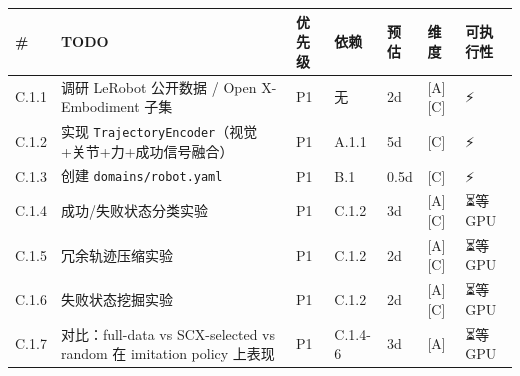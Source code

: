 \documentclass[
  12pt,
]{ctexart}
\begin{document}
\begin{longtable}[]{@{}
  >{\raggedright\arraybackslash}p{}
  >{\raggedright\arraybackslash}p{}
  >{\raggedright\arraybackslash}p{}
  >{\raggedright\arraybackslash}p{}
  >{\raggedright\arraybackslash}p{}
  >{\raggedright\arraybackslash}p{}
  >{\raggedright\arraybackslash}p{}@{}}
\toprule\noalign{}
\begin{minipage}[b]{\linewidth}\raggedright
\#
\end{minipage} & \begin{minipage}[b]{\linewidth}\raggedright
TODO
\end{minipage} & \begin{minipage}[b]{\linewidth}\raggedright
优先级
\end{minipage} & \begin{minipage}[b]{\linewidth}\raggedright
依赖
\end{minipage} & \begin{minipage}[b]{\linewidth}\raggedright
预估
\end{minipage} & \begin{minipage}[b]{\linewidth}\raggedright
维度
\end{minipage} & \begin{minipage}[b]{\linewidth}\raggedright
可执行性
\end{minipage} \\
\midrule\noalign{}
\endhead
\bottomrule\noalign{}
\endlastfoot
C.1.1 & 调研 LeRobot 公开数据 / Open X-Embodiment 子集 & P1 & 无 & 2d &
{[}A{]}{[}C{]} & ⚡ \\
C.1.2 & 实现 \texttt{TrajectoryEncoder}（视觉+关节+力+成功信号融合） &
P1 & A.1.1 & 5d & {[}C{]} & ⚡ \\
C.1.3 & 创建 \texttt{domains/robot.yaml} & P1 & B.1 & 0.5d & {[}C{]} &
⚡ \\
C.1.4 & 成功/失败状态分类实验 & P1 & C.1.2 & 3d & {[}A{]}{[}C{]} & ⏳等
GPU \\
C.1.5 & 冗余轨迹压缩实验 & P1 & C.1.2 & 2d & {[}A{]}{[}C{]} & ⏳等
GPU \\
C.1.6 & 失败状态挖掘实验 & P1 & C.1.2 & 2d & {[}A{]}{[}C{]} & ⏳等
GPU \\
C.1.7 & 对比：full-data vs SCX-selected vs random 在 imitation policy
上表现 & P1 & C.1.4-6 & 3d & {[}A{]} & ⏳等 GPU \\
\end{longtable}
\end{document}

